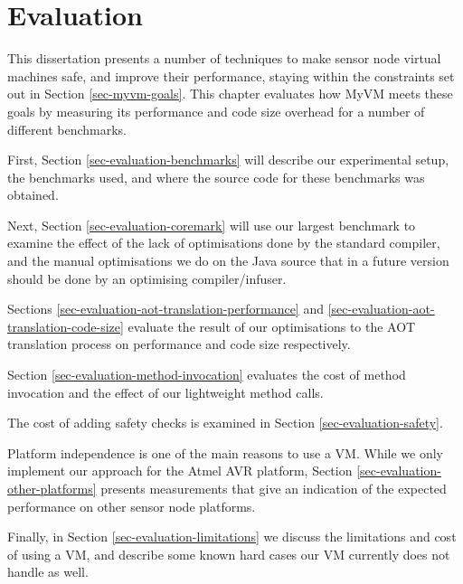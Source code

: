 \chapter{Evaluation}
\label{sec-evaluation}

This dissertation presents a number of techniques to make sensor node virtual machines safe, and improve their performance, staying within the constraints set out in Section \ref{sec-myvm-goals}. This chapter evaluates how MyVM meets these goals by measuring its performance and code size overhead for a number of different benchmarks.

First, Section \ref{sec-evaluation-benchmarks} will describe our experimental setup, the benchmarks used, and where the source code for these benchmarks was obtained.

Next, Section \ref{sec-evaluation-coremark} will use our largest benchmark to examine the effect of the lack of optimisations done by the standard  compiler, and the manual optimisations we do on the Java source that in a future version should be done by an optimising compiler/infuser.

Sections \ref{sec-evaluation-aot-translation-performance} and \ref{sec-evaluation-aot-translation-code-size} evaluate the result of our optimisations to the AOT translation process on performance and code size respectively.

Section \ref{sec-evaluation-method-invocation} evaluates the cost of method invocation and the effect of our lightweight method calls.

The cost of adding safety checks is examined in Section \ref{sec-evaluation-safety}.

Platform independence is one of the main reasons to use a VM. While we only implement our approach for the Atmel AVR platform, Section \ref{sec-evaluation-other-platforms} presents measurements that give an indication of the expected performance on other sensor node platforms.

Finally, in Section \ref{sec-evaluation-limitations} we discuss the limitations and cost of using a VM, and describe some known hard cases our VM currently does not handle as well.
